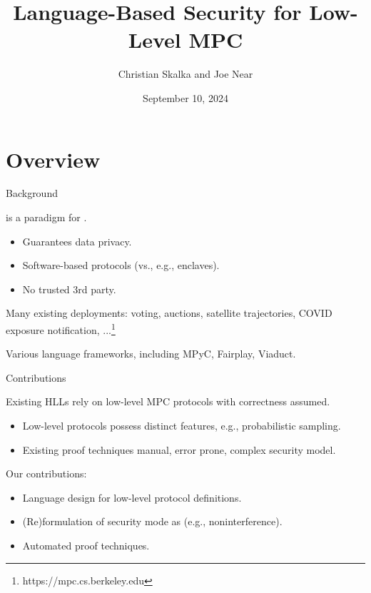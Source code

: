 \documentclass{beamer}
\title{Language-Based Security for Low-Level MPC}
\author{Christian Skalka and Joe Near}
\date{September 10, 2024}
\begin{document}
\begin{frame}
    \titlepage 
\end{frame}

\logo{}



\section{Overview}

\begin{frame}{Background}
  
   is a paradigm for
  .
  \begin{itemize}
  \item Guarantees data privacy.
  \item Software-based protocols (vs., e.g., enclaves).
  \item No trusted 3rd party.
  \end{itemize}
  Many existing deployments: voting, auctions, satellite trajectories, COVID exposure notification, ...\footnote{https://mpc.cs.berkeley.edu}

  \medskip

  Various language frameworks, including MPyC, Fairplay, Viaduct.
\end{frame}

\begin{frame}{Contributions}

  Existing HLLs rely on low-level MPC protocols with correctness
  assumed.
  \begin{itemize}
  \item Low-level protocols possess distinct features, e.g., probabilistic sampling.
  \item Existing proof techniques manual, error prone, complex security model.
  \end{itemize}
  Our contributions:
  \begin{itemize}
  \item Language design for low-level protocol definitions.
  \item (Re)formulation of security mode as  (e.g., noninterference).
  \item Automated proof techniques.
  \end{itemize}
  
\end{frame}
\end{document}
